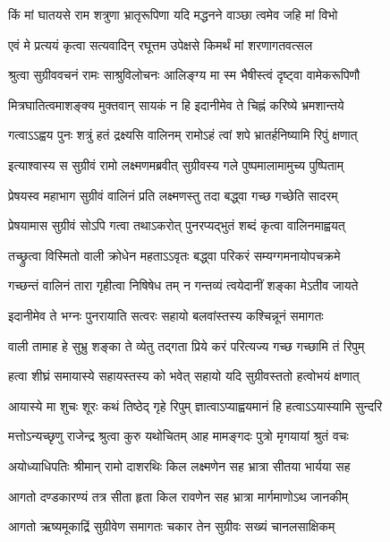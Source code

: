 \twolineshloka
{किं मां घातयसे राम शत्रुणा भ्रातृरूपिणा}
{यदि मद्धनने वाञ्छा त्वमेव जहि मां विभो} %

\twolineshloka
{एवं मे प्रत्ययं कृत्वा सत्यवादिन् रघूत्तम}
{उपेक्षसे किमर्थं मां शरणागतवत्सल} %

\twolineshloka
{श्रुत्वा सुग्रीववचनं रामः साश्रुविलोचनः}
{आलिङ्ग्य मा स्म भैषीस्त्वं दृष्ट्वा वामेकरूपिणौ} %

\twolineshloka
{मित्रघातित्वमाशङ्क्य मुक्तवान् सायकं न हि}
{इदानीमेव ते चिह्नं करिष्ये भ्रमशान्तये} %

\twolineshloka
{गत्वाऽऽह्वय पुनः शत्रुं हतं द्रक्ष्यसि वालिनम्}
{रामोऽहं त्वां शपे भ्रातर्हनिष्यामि रिपुं क्षणात्} %

\twolineshloka
{इत्याश्वास्य स सुग्रीवं रामो लक्ष्मणमब्रवीत्}
{सुग्रीवस्य गले पुष्पमालामामुच्य पुष्पिताम्} %

\twolineshloka
{प्रेषयस्व महाभाग सुग्रीवं वालिनं प्रति}
{लक्ष्मणस्तु तदा बद्ध्वा गच्छ गच्छेति सादरम्} %

\twolineshloka
{प्रेषयामास सुग्रीवं सोऽपि गत्वा तथाऽकरोत्}
{पुनरप्यद्भुतं शब्दं कृत्वा वालिनमाह्वयत्} %

\twolineshloka
{तच्छ्रुत्वा विस्मितो वाली क्रोधेन महताऽऽवृतः}
{बद्ध्वा परिकरं सम्यग्गमनायोपचक्रमे} %

\twolineshloka
{गच्छन्तं वालिनं तारा गृहीत्वा निषिषेध तम्}
{न गन्तव्यं त्वयेदानीं शङ्का मेऽतीव जायते} %

\twolineshloka
{इदानीमेव ते भग्नः पुनरायाति सत्वरः}
{सहायो बलवांस्तस्य कश्चिन्नूनं समागतः} %

\twolineshloka
{वाली तामाह हे सुभ्रु शङ्का ते व्येतु तद्गता}
{प्रिये करं परित्यज्य गच्छ गच्छामि तं रिपुम्} %

\twolineshloka
{हत्वा शीघ्रं समायास्ये सहायस्तस्य को भवेत्}
{सहायो यदि सुग्रीवस्ततो हत्वोभयं क्षणात्} %

\twolineshloka
{आयास्ये मा शुचः शूरः कथं तिष्ठेद् गृहे रिपुम्}
{ज्ञात्वाऽप्याह्वयमानं हि हत्वाऽऽयास्यामि सुन्दरि} %


\twolineshloka
{मत्तोऽन्यच्छृणु राजेन्द्र श्रुत्वा कुरु यथोचितम्}
{आह मामङ्गदः पुत्रो मृगयायां श्रुतं वचः} %

\twolineshloka
{अयोध्याधिपतिः श्रीमान् रामो दाशरथिः किल}
{लक्ष्मणेन सह भ्रात्रा सीतया भार्यया सह} %

\twolineshloka
{आगतो दण्डकारण्यं तत्र सीता हृता किल}
{रावणेन सह भ्रात्रा मार्गमाणोऽथ जानकीम्} %

\twolineshloka
{आगतो ऋष्यमूकाद्रिं सुग्रीवेण समागतः}
{चकार तेन सुग्रीवः सख्यं चानलसाक्षिकम्} %

